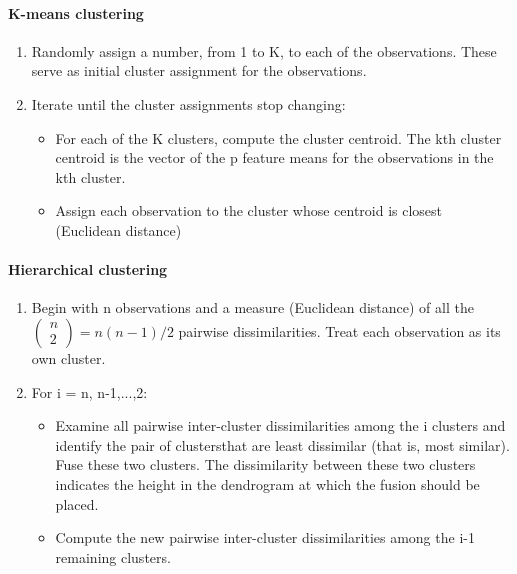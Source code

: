 \documentclass[../document.tex]{subfiles}
\begin{document}
	\paragraph{K-means clustering}
	\begin{center}
		\begin{enumerate}
			\item Randomly assign a number, from 1 to K, to each of the observations. These serve as initial cluster assignment for the observations.
			\item Iterate until the cluster assignments stop changing:
			\begin{itemize}
				\item For each of the K clusters, compute the cluster centroid. The kth cluster centroid is the vector of the p feature means for the observations in the kth cluster.
				\item Assign each observation to the cluster whose centroid is closest (Euclidean distance)
			\end{itemize}
		\end{enumerate}
	\end{center}
	\paragraph{Hierarchical clustering}
	\begin{center}
		\begin{enumerate}
			\item Begin with n observations and a measure (Euclidean distance) of all the
			\(
			\begin{pmatrix}
			n\\2
			\end{pmatrix} = n(n-1)/2
			\)
			pairwise dissimilarities. Treat each observation as its own cluster.
			\item For i = n, n-1,...,2:
			\begin{itemize}
				\item Examine all pairwise inter-cluster dissimilarities among the i clusters and identify the pair of clustersthat are least dissimilar (that is, most similar). Fuse these two clusters. The dissimilarity between these two clusters indicates the height in the dendrogram at which the fusion should be placed.
				\item Compute the new pairwise inter-cluster dissimilarities among the i-1 remaining clusters.
			\end{itemize}
		\end{enumerate}
	\end{center}
\end{document}
